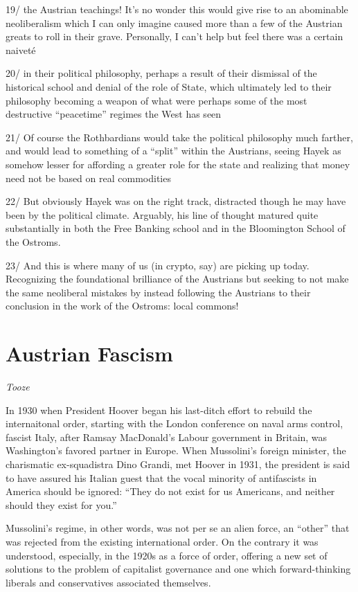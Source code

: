 \documentclass[
]{book}
\begin{document}
19/ the Austrian teachings! It's no wonder this would give rise to an abominable neoliberalism which I can only imagine caused more than a few of the Austrian greats to roll in their grave. Personally, I can't help but feel there was a certain naiveté

20/ in their political philosophy, perhaps a result of their dismissal of the historical school and denial of the role of State, which ultimately led to their philosophy becoming a weapon of what were perhaps some of the most destructive ``peacetime'' regimes the West has seen

21/ Of course the Rothbardians would take the political philosophy much farther, and would lead to something of a ``split'' within the Austrians, seeing Hayek as somehow lesser for affording a greater role for the state and realizing that money need not be based on real commodities

22/ But obviously Hayek was on the right track, distracted though he may have been by the political climate. Arguably, his line of thought matured quite substantially in both the Free Banking school and in the Bloomington School of the Ostroms.

23/ And this is where many of us (in crypto, say) are picking up today. Recognizing the foundational brilliance of the Austrians but seeking to not make the same neoliberal mistakes by instead following the Austrians to their conclusion in the work of the Ostroms: local commons!

\hypertarget{austrian-fascism}{%
\section{Austrian Fascism}\label{austrian-fascism}}

\emph{Tooze}

In 1930 when President Hoover began his last-ditch effort to rebuild the internaitonal order, starting with the London conference on naval arms control, fascist Italy, after Ramsay MacDonald's Labour government in Britain, was Washington's favored partner in Europe. When Mussolini's foreign minister, the charismatic ex-squadistra Dino Grandi, met Hoover in 1931, the president is said to have assured his Italian guest that the vocal minority of antifascists in America should be ignored: ``They do not exist for us Americans, and neither should they exist for you.''

Mussolini's regime, in other words, was not per se an alien force, an ``other'' that was rejected from the existing international order. On the contrary it was understood, especially, in the 1920s as a force of order, offering a new set of solutions to the problem of capitalist governance and one which forward-thinking liberals and conservatives associated themselves.
\end{document}

